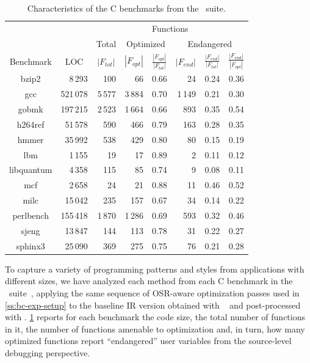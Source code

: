 \begin{table}[!t]
\begin{center}
\begin{small}
\begin{tabular}{ |c|r|r|r|r|r|r|r| }
\cline{3-8}
\multicolumn{2}{l|}{} & \multicolumn{6}{c|}{Functions} \\
\cline{3-8}
\multicolumn{2}{l|}{} & \multicolumn{1}{c|}{Total} & \multicolumn{2}{c|}{Optimized} & \multicolumn{3}{c|}{Endangered} \\
\hline
Benchmark & \multicolumn{1}{c|}{LOC} & \multicolumn{1}{c|}{$|F_{tot}|$} & \multicolumn{1}{c|}{$|F_{opt}|$}  & \multicolumn{1}{c|}{\tiny$\frac{|F_{opt}|}{|F_{tot}|}$} & \multicolumn{1}{c|}{$|F_{end}|$} & \multicolumn{1}{c|}{\tiny$\frac{|F_{end}|}{|F_{tot}|}$} & \multicolumn{1}{c|}{\tiny$\frac{|F_{end}|}{|F_{opt}|}$} \\ 
\hline
\hline
bzip2 & 8\,293 & 100 & 66 & 0.66 & 24 & 0.24 & 0.36 \\ 
\hline
gcc & 521\,078 & 5\,577 & 3\,884 & 0.70 & 1\,149 & 0.21 & 0.30 \\
\hline
gobmk & 197\,215 & 2\,523 & 1\,664 & 0.66 & 893 & 0.35 & 0.54 \\ 
\hline
h264ref & 51\,578 & 590 & 466 & 0.79 & 163 & 0.28 & 0.35 \\ 
\hline
hmmer & 35\,992 & 538 & 429 & 0.80 & 80 & 0.15 & 0.19 \\ 
\hline
lbm & 1\,155 & 19 & 17 & 0.89 & 2 & 0.11 & 0.12 \\ 
\hline
libquantum & 4\,358 & 115 & 85 & 0.74 & 9 & 0.08 & 0.11\\ 
\hline
mcf & 2\,658 & 24 & 21 & 0.88 & 11 & 0.46 & 0.52 \\ 
\hline
milc & 15\,042 & 235 & 157 & 0.67 & 34 & 0.14 & 0.22\\ 
\hline
perlbench & 155\,418 & 1\,870 & 1\,286 & 0.69 & 593 & 0.32 & 0.46 \\ 
\hline
sjeng & 13\,847 & 144 & 113 & 0.78 & 31 & 0.22 & 0.27 \\ 
\hline
sphinx3 & 25\,090 & 369 & 275 & 0.75 & 76 & 0.21 & 0.28 \\ 
\hline
\end{tabular} 
\end{small}
\end{center}
\caption{\label{tab:CS-debug-benchmarks} Characteristics of the C benchmarks from the \speccpu\ suite.} 
\end{table}

To capture a variety of programming patterns and styles from applications with different sizes, we have analyzed each method from each C benchmark in the \speccpu\ suite~\cite{Henning06}, applying the same sequence of OSR-aware optimization passes used in \mysection\ref{ss:bc-exp-setup} to the baseline IR version obtained with \clang\  and post-processed with \memtoreg. \mytable\ref{tab:CS-debug-benchmarks} reports for each benchmark the code size, the total number of functions in it, the number of functions amenable to optimization and, in turn, how many optimized functions report ``endangered'' user variables from the source-level debugging perspective.

